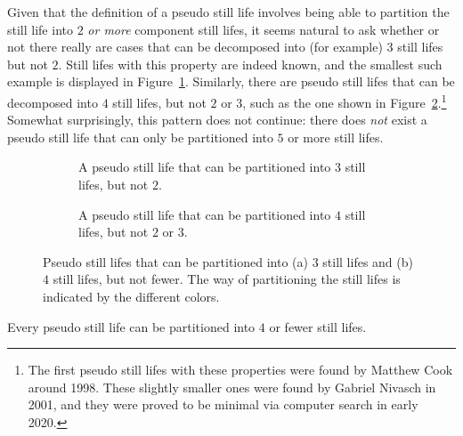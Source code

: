 Given that the definition of a pseudo still life involves being able to partition the still life into $2$ \emph{or more} component still lifes, it seems natural to ask whether or not there really are cases that can be decomposed into (for example) $3$ still lifes but not $2$. Still lifes with this property are indeed known, and the smallest such example is displayed in Figure~\ref{fig:triple_pseudo_still_life}. Similarly, there are pseudo still lifes that can be decomposed into $4$ still lifes, but not $2$ or $3$, such as the one shown in Figure~\ref{fig:quad_pseudo_still_life}.\footnote{The first pseudo still lifes with these properties were found by Matthew Cook around 1998. These slightly smaller ones were found by Gabriel Nivasch in 2001, and they were proved to be minimal via computer search in early 2020.} Somewhat surprisingly, this pattern does not continue: there does \emph{not} exist a pseudo still life that can only be partitioned into $5$ or more still lifes.

\begin{figure}[!htb]
	\begin{subfigure}{.48\textwidth}
		\centering
		\caption{A pseudo still life that can be partitioned into $3$ still lifes, but not $2$.}
		\label{fig:triple_pseudo_still_life}
	\end{subfigure} \quad %
	\begin{subfigure}{.48\textwidth}
		\centering
		\caption{A pseudo still life that can be partitioned into $4$ still lifes, but not $2$ or $3$.}
		\label{fig:quad_pseudo_still_life}
	\end{subfigure}
	\caption{Pseudo still lifes that can be partitioned into (a) $3$ still lifes  and (b) $4$ still lifes, but not fewer. The way of partitioning the still lifes is indicated by the different colors.}\label{fig:pseudo_still_life_decompose}
\end{figure}

\begin{theorem}\label{thm:pseudo_still_four}
	Every pseudo still life can be partitioned into $4$ or fewer still lifes.
\end{theorem}

